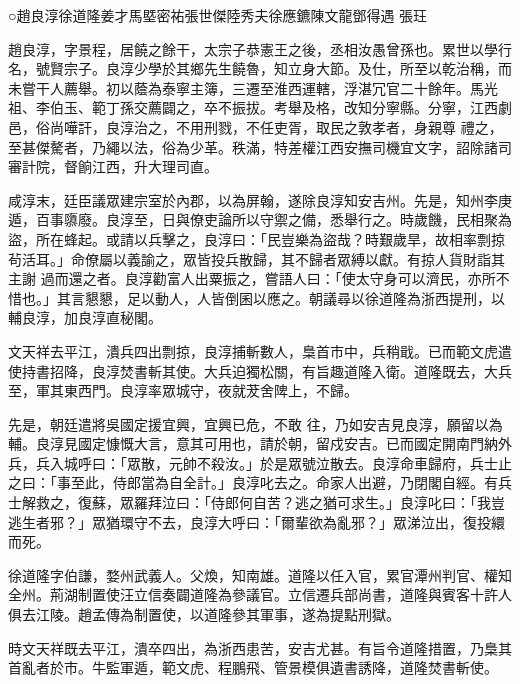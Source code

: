 
\begin{pinyinscope}

 ○趙良淳徐道隆姜才馬塈密祐張世傑陸秀夫徐應鑣陳文龍鄧得遇
 張玨



 趙良淳，字景程，居饒之餘干，太宗子恭憲王之後，丞相汝愚曾孫也。累世以學行名，號賢宗子。良淳少學於其鄉先生饒魯，知立身大節。及仕，所至以乾治稱，而未嘗干人薦舉。初以蔭為泰寧主簿，三遷至淮西運轄，浮湛冗官二十餘年。馬光祖、李伯玉、範丁孫交薦闢之，卒不振拔。考舉及格，改知分寧縣。分寧，江西劇邑，俗尚嘩訐，良淳治之，不用刑戮，不任吏胥，取民之敦孝者，身親尊
 禮之，至甚傑驁者，乃繩以法，俗為少革。秩滿，特差權江西安撫司機宜文字，詔除諸司審計院，督餉江西，升大理司直。



 咸淳末，廷臣議眾建宗室於內郡，以為屏翰，遂除良淳知安吉州。先是，知州李庚遁，百事隳廢。良淳至，日與僚吏論所以守禦之備，悉舉行之。時歲饑，民相聚為盜，所在蜂起。或請以兵擊之，良淳曰：「民豈樂為盜哉？時艱歲旱，故相率剽掠茍活耳。」命僚屬以義諭之，眾皆投兵散歸，其不歸者眾縛以獻。有掠人貨財詣其主謝
 過而還之者。良淳勸富人出粟振之，嘗語人曰：「使太守身可以濟民，亦所不惜也。」其言懇懇，足以動人，人皆倒囷以應之。朝議尋以徐道隆為浙西提刑，以輔良淳，加良淳直秘閣。



 文天祥去平江，潰兵四出剽掠，良淳捕斬數人，梟首市中，兵稍戢。已而範文虎遣使持書招降，良淳焚書斬其使。大兵迫獨松關，有旨趣道隆入衛。道隆既去，大兵至，軍其東西門。良淳率眾城守，夜就茇舍陴上，不歸。



 先是，朝廷遣將吳國定援宜興，宜興已危，不敢
 往，乃如安吉見良淳，願留以為輔。良淳見國定慷慨大言，意其可用也，請於朝，留戍安吉。已而國定開南門納外兵，兵入城呼曰：「眾散，元帥不殺汝。」於是眾號泣散去。良淳命車歸府，兵士止之曰：「事至此，侍郎當為自全計。」良淳叱去之。命家人出避，乃閉閣自經。有兵士解救之，復蘇，眾羅拜泣曰：「侍郎何自苦？逃之猶可求生。」良淳叱曰：「我豈逃生者邪？」眾猶環守不去，良淳大呼曰：「爾輩欲為亂邪？」眾涕泣出，復投繯而死。



 徐道隆字伯謙，婺州武義人。父煥，知南雄。道隆以任入官，累官潭州判官、權知全州。荊湖制置使汪立信奏闢道隆為參議官。立信遷兵部尚書，道隆與賓客十許人俱去江陵。趙孟傳為制置使，以道隆參其軍事，遂為提點刑獄。



 時文天祥既去平江，潰卒四出，為浙西患苦，安吉尤甚。有旨令道隆措置，乃梟其首亂者於市。牛監軍遁，範文虎、程鵬飛、管景模俱遺書誘降，道隆焚書斬使。




\end{pinyinscope}
